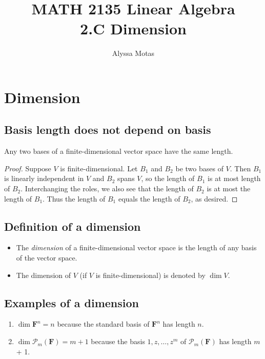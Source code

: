 \documentclass[11pt]{article}
\title{\textbf{MATH 2135 Linear Algebra} \\ 2.C Dimension}
\author{Alyssa Motas}
\begin{document}
    \maketitle

    \pagebreak

    \tableofcontents

    \pagebreak

    \section{Dimension}

    \subsection{Basis length does not depend on basis}

    Any two bases of a finite-dimensional vector space have the same length.

    \begin{proof}
        Suppose $V$ is finite-dimensional. Let $B_1$ and $B_2$ be two bases of $V$. Then $B_1$ is linearly independent in $V$ and $B_2$ spans $V$, so the length of $B_1$ is at most length of $B_2$. Interchanging the roles, we also see that the length of $B_2$ is at most the length of $B_1$. Thus the length of $B_1$ equals the length of $B_2$, as desired.
    \end{proof}

    \subsection{Definition of a dimension}

    \begin{itemize}
        \item The \emph{dimension} of a finite-dimensional vector space is the length of any basis of the vector space.
        \item The dimension of $V$ (if $V$ is finite-dimensional) is denoted by \(\dim V\).
    \end{itemize}

    \subsection{Examples of a dimension}

    \begin{enumerate}
        \item \(\dim \textbf{F}^n = n\) because the standard basis of \(\textbf{F}^n\) has length $n$.
        \item \(\dim \mathcal{P}_m(\textbf{F}) = m + 1\) because the basis \(1,z,\dots,z^m\) of \(\mathcal{P}_m(\textbf{F})\) has length $m$ + 1.
    \end{enumerate}
\end{document}
